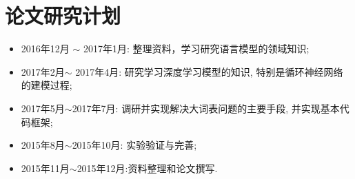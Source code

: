 \documentclass[12pt,a4paper]{article}
\begin{document}
\section{论文研究计划}
\begin{itemize}
  \item 2016年12月 $\sim$ 2017年1月: 整理资料，学习研究语言模型的领域知识;
  \item 2017年2月$\sim$ 2017年4月: 研究学习深度学习模型的知识, 特别是循环神经网络的建模过程;
  \item 2017年5月$\sim$2017年7月: 调研并实现解决大词表问题的主要手段, 并实现基本代码框架;
  \item 2015年8月$\sim$2015年10月: 实验验证与完善;
  \item 2015年11月$\sim$2015年12月:资料整理和论文撰写.
\end{itemize}

\newpage
{}

\end{document}
